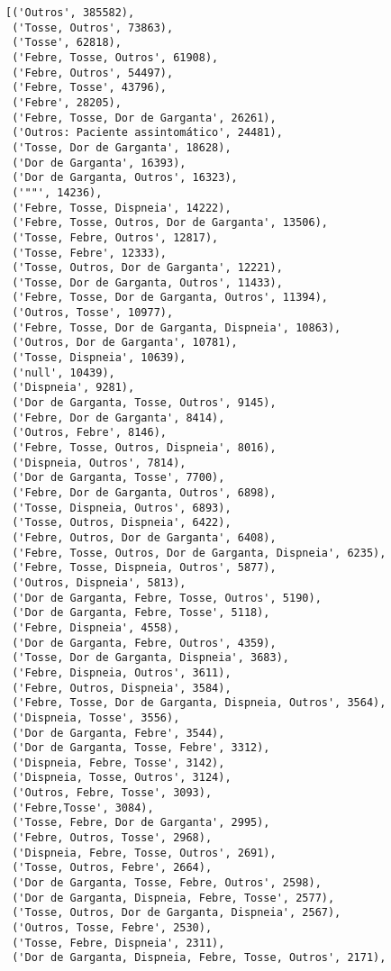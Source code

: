 \documentclass[11pt]{article}
\makeatletter
\newcommand{\boxspacing}{\kern\kvtcb@left@rule\kern\kvtcb@boxsep}
\newcommand{\prompt}[4]{
        \ttfamily\llap{{\color{#2}[#3]:\hspace{3pt}#4}}\vspace{-\baselineskip}
    }
\makeatother
\begin{document}
            \begin{tcolorbox}[breakable, size=fbox, boxrule=.5pt, pad at break*=1mm, opacityfill=0]
\prompt{Out}{outcolor}{6}{\boxspacing}
\begin{Verbatim}[commandchars=\\\{\}]
[('Outros', 385582),
 ('Tosse, Outros', 73863),
 ('Tosse', 62818),
 ('Febre, Tosse, Outros', 61908),
 ('Febre, Outros', 54497),
 ('Febre, Tosse', 43796),
 ('Febre', 28205),
 ('Febre, Tosse, Dor de Garganta', 26261),
 ('Outros: Paciente assintomático', 24481),
 ('Tosse, Dor de Garganta', 18628),
 ('Dor de Garganta', 16393),
 ('Dor de Garganta, Outros', 16323),
 ('""', 14236),
 ('Febre, Tosse, Dispneia', 14222),
 ('Febre, Tosse, Outros, Dor de Garganta', 13506),
 ('Tosse, Febre, Outros', 12817),
 ('Tosse, Febre', 12333),
 ('Tosse, Outros, Dor de Garganta', 12221),
 ('Tosse, Dor de Garganta, Outros', 11433),
 ('Febre, Tosse, Dor de Garganta, Outros', 11394),
 ('Outros, Tosse', 10977),
 ('Febre, Tosse, Dor de Garganta, Dispneia', 10863),
 ('Outros, Dor de Garganta', 10781),
 ('Tosse, Dispneia', 10639),
 ('null', 10439),
 ('Dispneia', 9281),
 ('Dor de Garganta, Tosse, Outros', 9145),
 ('Febre, Dor de Garganta', 8414),
 ('Outros, Febre', 8146),
 ('Febre, Tosse, Outros, Dispneia', 8016),
 ('Dispneia, Outros', 7814),
 ('Dor de Garganta, Tosse', 7700),
 ('Febre, Dor de Garganta, Outros', 6898),
 ('Tosse, Dispneia, Outros', 6893),
 ('Tosse, Outros, Dispneia', 6422),
 ('Febre, Outros, Dor de Garganta', 6408),
 ('Febre, Tosse, Outros, Dor de Garganta, Dispneia', 6235),
 ('Febre, Tosse, Dispneia, Outros', 5877),
 ('Outros, Dispneia', 5813),
 ('Dor de Garganta, Febre, Tosse, Outros', 5190),
 ('Dor de Garganta, Febre, Tosse', 5118),
 ('Febre, Dispneia', 4558),
 ('Dor de Garganta, Febre, Outros', 4359),
 ('Tosse, Dor de Garganta, Dispneia', 3683),
 ('Febre, Dispneia, Outros', 3611),
 ('Febre, Outros, Dispneia', 3584),
 ('Febre, Tosse, Dor de Garganta, Dispneia, Outros', 3564),
 ('Dispneia, Tosse', 3556),
 ('Dor de Garganta, Febre', 3544),
 ('Dor de Garganta, Tosse, Febre', 3312),
 ('Dispneia, Febre, Tosse', 3142),
 ('Dispneia, Tosse, Outros', 3124),
 ('Outros, Febre, Tosse', 3093),
 ('Febre,Tosse', 3084),
 ('Tosse, Febre, Dor de Garganta', 2995),
 ('Febre, Outros, Tosse', 2968),
 ('Dispneia, Febre, Tosse, Outros', 2691),
 ('Tosse, Outros, Febre', 2664),
 ('Dor de Garganta, Tosse, Febre, Outros', 2598),
 ('Dor de Garganta, Dispneia, Febre, Tosse', 2577),
 ('Tosse, Outros, Dor de Garganta, Dispneia', 2567),
 ('Outros, Tosse, Febre', 2530),
 ('Tosse, Febre, Dispneia', 2311),
 ('Dor de Garganta, Dispneia, Febre, Tosse, Outros', 2171),

\end{Verbatim}
\end{tcolorbox}
\end{document}
